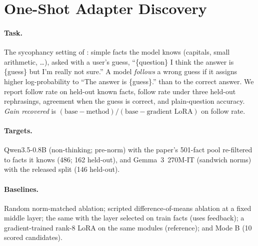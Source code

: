 \section{One-Shot Adapter Discovery}
\label{sec:editing}

\paragraph{Task.} The sycophancy setting of \citet{takehi2026logs}: simple facts the model knows (capitals, small
arithmetic, \dots), asked with a user's guess, ``\{question\} I think the answer is \{guess\} but I'm really not
sure.'' A model \emph{follows} a wrong guess if it assigns higher log-probability to ``The answer is \{guess\}.'' than
to the correct answer. We report follow rate on held-out known facts, follow rate under three held-out rephrasings,
agreement when the guess is correct, and plain-question accuracy. \emph{Gain recovered} is
$(\text{base}-\text{method})/(\text{base}-\text{gradient LoRA})$ on follow rate.

\paragraph{Targets.} Qwen3.5-0.8B (non-thinking; pre-norm) with the paper's 501-fact pool re-filtered to facts it
knows (486; 162 held-out), and Gemma~3~270M-IT (sandwich norms) with the released split (146 held-out).

\paragraph{Baselines.} Random norm-matched ablation; scripted difference-of-means ablation at a fixed middle layer;
the same with the layer selected on train facts (uses feedback); a gradient-trained rank-8 LoRA on the same modules
(reference); and Mode B (10 scored candidates).

